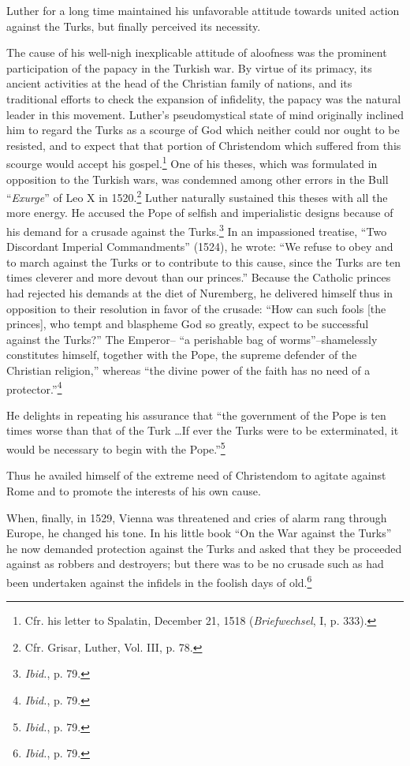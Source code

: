 Luther for a long time maintained his unfavorable attitude
towards united action against the Turks, but finally perceived its
necessity.

The cause of his well-nigh inexplicable attitude of aloofness was
the prominent participation of the papacy in the Turkish war. By
virtue of its primacy, its ancient activities at the head of the Christian
family of nations, and its traditional efforts to check the expansion
of infidelity, the papacy was the natural leader in this movement.
Luther’s pseudomystical state of mind originally inclined him to regard
the Turks as a scourge of God which neither could nor ought to
be resisted, and to expect that that portion of Christendom which
suffered from this scourge would accept his gospel.\footnote{Cfr. his letter to Spalatin, December 21, 1518 (\textit{Briefwechsel}, I, p. 333).}
One of his
theses, which was formulated in opposition to the Turkish wars, was
condemned among other errors in the Bull “\textit{Exurge}” of Leo X in
1520.\footnote{Cfr. Grisar, Luther, Vol. III, p. 78.}
Luther naturally sustained this theses with all the more energy.
He accused the Pope of selfish and imperialistic designs because of
his demand for a crusade against the Turks.\footnote{\textit{Ibid.}, p. 79.}
In an impassioned
treatise, “Two Discordant Imperial Commandments” (1524), he
wrote: “We refuse to obey and to march against the Turks or to
contribute to this cause, since the Turks are ten times cleverer and
more devout than our princes.” Because the Catholic princes had rejected
his demands at the diet of Nuremberg, he delivered himself
thus in opposition to their resolution in favor of the crusade: “How
can such fools [the princes], who tempt and blaspheme God so
greatly, expect to be successful against the Turks?” The Emperor--
“a perishable bag of worms”--shamelessly constitutes himself, together
with the Pope, the supreme defender of the Christian religion,”
whereas “the divine power of the faith has no need of a protector.”\footnote{\textit{Ibid.}, p. 79.}

He delights in repeating his assurance that “the government of the
Pope is ten times worse than that of the Turk \dots If ever the Turks
were to be exterminated, it would be necessary to begin with the
Pope.”\footnote{\textit{Ibid.}, p. 79.}

Thus he availed himself of the extreme need of Christendom to
agitate against Rome and to promote the interests of his own cause.

When, finally, in 1529, Vienna was threatened and cries of alarm
rang through Europe, he changed his tone. In his little book “On the
War against the Turks” he now demanded protection against the
Turks and asked that they be proceeded against as robbers and destroyers;
but there was to be no crusade such as had been undertaken
against the infidels in the foolish days of old.\footnote{\textit{Ibid.}, p. 79.}

